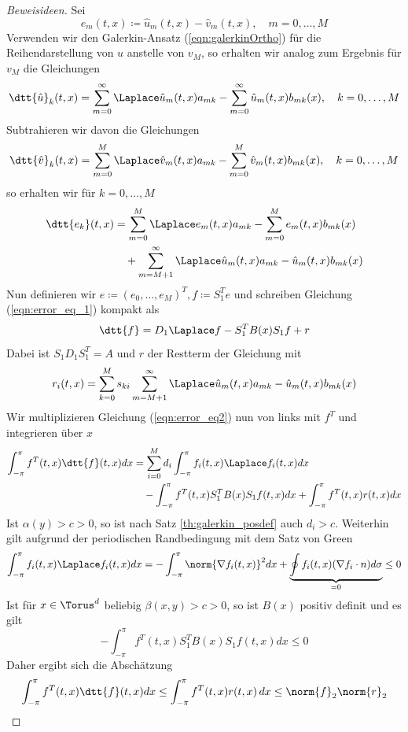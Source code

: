 \begin{proof}[Beweisideen]
Sei 
\[e_m(t,x)\coloneqq \hat{u}_m(t,x)-\hat{v}_m(t,x),\quad m=0,\dots,M\]
Verwenden wir den Galerkin-Ansatz (\ref{eqn:galerkinOrtho}) für die Reihendarstellung von $u$ anstelle von $v_M$, so erhalten wir analog zum Ergebnis für $v_M$ die Gleichungen
\begin{equation}
\dtt{\hat{u}}_k(t,x)=\sum_{m=0}^\infty \Laplace \hat{u}_m(t,x)a_{mk}-\sum_{m=0}^\infty \hat{u}_m(t,x)b_{mk}(x),\quad k=0,\dots,M
\end{equation}
Subtrahieren wir davon die Gleichungen
\begin{equation}
\dtt{\hat{v}}_k(t,x)=\sum_{m=0}^M\Laplace \hat{v}_m(t,x)a_{mk}-\sum_{m=0}^M\hat{v}_m(t,x)b_{mk}(x),\quad k=0,\dots,M
\end{equation}
so erhalten wir für $k=0,\dots,M$
\begin{equation}
\label{eqn:error_eq_1}
\begin{split}
\dtt{e_k}(t,x)&=\sum_{m=0}^M\Laplace e_m(t,x)a_{mk}-\sum_{m=0}^M e_m(t,x)b_{mk}(x)\\
&\quad +\sum_{m=M+1}^\infty \Laplace \hat{u}_m(t,x)a_{mk}-\hat{u}_m(t,x)b_{mk}(x)
\end{split}
\end{equation}
Nun definieren wir $e\coloneqq (e_0,\dots,e_M)^T, f\coloneqq S_1^Te$ und schreiben Gleichung (\ref{eqn:error_eq_1}) kompakt als
\begin{equation}
\label{eqn:error_eq2}
\dtt{f}=D_1\Laplace f-S_1^TB(x)S_1f+r
\end{equation}
Dabei ist $S_1D_1S_1^T=A$ und $r$ der Restterm der Gleichung mit
\[r_{i}(t,x)=\sum_{k=0}^Ms_{ki}\sum_{m=M+1}^\infty \Laplace \hat{u}_m(t,x)a_{mk}-\hat{u}_m(t,x)b_{mk}(x)\]
Wir multiplizieren Gleichung (\ref{eqn:error_eq2}) nun von links mit $f^T$ und integrieren über $x$
\begin{align*}
\int_{-\pi}^\pi f^T(t,x)\dtt{f}(t,x)dx&=\sum_{i=0}^M d_i\int_{-\pi}^\pi f_i(t,x)\Laplace f_i(t,x)dx\\
&\quad -\int_{-\pi}^\pi f^T(t,x)S_1^TB(x)S_1f(t,x)dx+\int_{-\pi}^\pi f^T(t,x)r(t,x)dx
\end{align*}
Ist $\alpha(y)>c>0$, so ist nach Satz \ref{th:galerkin_posdef} auch $d_i>c$. Weiterhin gilt aufgrund der periodischen Randbedingung mit dem Satz von Green
\[\int_{-\pi}^\pi f_i(t,x)\Laplace f_i(t,x)dx=-\int_{-\pi}^\pi \norm{\nabla f_i(t,x)}^2dx+\underbrace{\oint f_i(t,x)(\nabla f_i\cdot n)d\sigma}_{=0}\le 0\]
Ist für $x\in\Torus^d$ beliebig $\beta(x,y)>c>0$, so ist $B(x)$ positiv definit und es gilt
\[-\int_{-\pi}^\pi f^T(t,x)S_1^TB(x)S_1f(t,x)dx\le 0\]
Daher ergibt sich die Abschätzung
\begin{equation}
\int_{-\pi}^\pi f^T(t,x)\dtt{f}(t,x)dx\le \int_{-\pi}^\pi f^T(t,x)r(t,x)\,dx\le \norm{f}_2\norm{r}_2 
\end{equation}
\end{proof}
